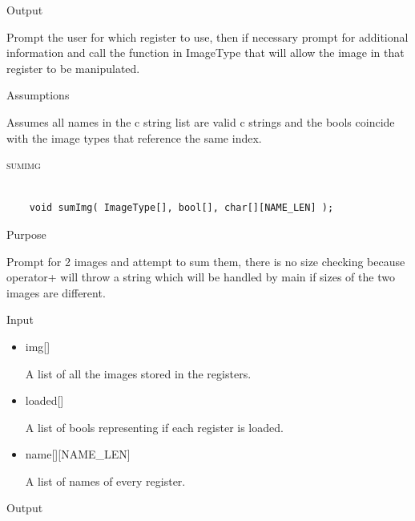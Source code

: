 \documentclass[pdftex, 11pt]{article}
\begin{document}
\begin{description}
\begin{description}
\begin{itemize}
				\end{itemize}

			\item{Output}

				Prompt the user for which register to use, then if necessary
				prompt for additional information and call the function
				in ImageType that will allow the image in that register to
				be manipulated.

			\item{Assumptions}

				Assumes all names in the c string list are valid c
				strings and the bools coincide with the image types that
				reference the same index.

		\end{description}



	\item{\textsc{sumimg}}

		\begin{lstlisting}

	void sumImg( ImageType[], bool[], char[][NAME_LEN] );
		\end{lstlisting}

		\begin{description}
			\item{Purpose}

				Prompt for 2 images and attempt to sum them, there is no size checking because
				operator+ will throw a string which will be handled by main if sizes of the
				two images are different.

			\item{Input}

				\begin{itemize}

					\item{img[]}

						A list of all the images stored in the registers.

					\item{loaded[]}

						A list of bools representing if each register is loaded.

					\item{name[][NAME\_LEN]}

						A list of names of every register.

				\end{itemize}

			\item{Output}


\end{description}
\end{description}
\end{document}
